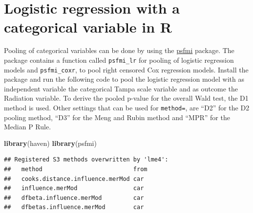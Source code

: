 \documentclass[
]{book}
\newenvironment{Shaded}{\begin{snugshade}}{\end{snugshade}}
\newcommand{\DataTypeTok}[1]{\textcolor[rgb]{0.13,0.29,0.53}{#1}}
\newcommand{\DecValTok}[1]{\textcolor[rgb]{0.00,0.00,0.81}{#1}}
\newcommand{\KeywordTok}[1]{\textcolor[rgb]{0.13,0.29,0.53}{\textbf{#1}}}
\newcommand{\NormalTok}[1]{#1}
\newcommand{\OperatorTok}[1]{\textcolor[rgb]{0.81,0.36,0.00}{\textbf{#1}}}
\newcommand{\StringTok}[1]{\textcolor[rgb]{0.31,0.60,0.02}{#1}}
\begin{document}
\hypertarget{logistic-regression-with-a-categorical-variable-in-r}{%
\section{Logistic regression with a categorical variable in R}\label{logistic-regression-with-a-categorical-variable-in-r}}

Pooling of categorical variables can be done by using the \href{https://mwheymans.github.io/psfmi/}{psfmi} package. The package contains a function called \texttt{psfmi\_lr} for pooling of logistic regression models and \texttt{psfmi\_coxr}, to pool right censored Cox regression models. Install the package and run the following code to pool the logistic regression model with as independent variable the categorical Tampa scale variable and as outcome the Radiation variable. To derive the pooled p-value for the overall Wald test, the D1 method is used. Other settings that can be used for \texttt{method=}, are ``D2'' for the D2 pooling method, ``D3'' for the Meng and Rubin method and ``MPR'' for the Median P Rule.

\begin{Shaded}
\begin{Highlighting}[]
\KeywordTok{library}\NormalTok{(haven)}
\KeywordTok{library}\NormalTok{(psfmi)}
\end{Highlighting}
\end{Shaded}

\begin{verbatim}
## Registered S3 methods overwritten by 'lme4':
##   method                          from
##   cooks.distance.influence.merMod car 
##   influence.merMod                car 
##   dfbeta.influence.merMod         car 
##   dfbetas.influence.merMod        car
\end{verbatim}

\begin{Shaded}
\end{Shaded}
\end{document}
